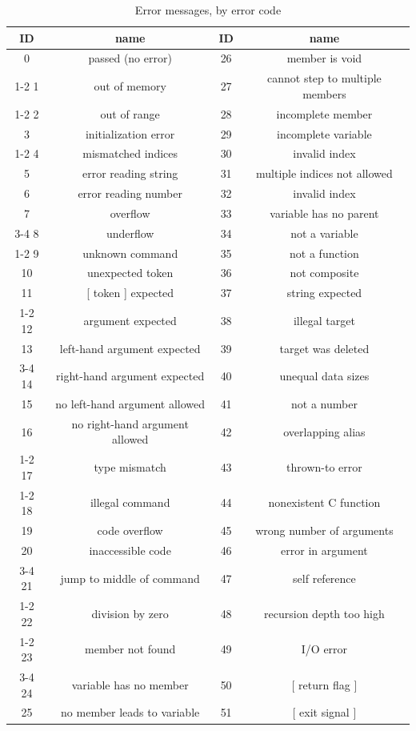 \documentclass{article}
\begin{document}
\begin{table}
\begin{center}
\begin{tabular}{|c|c||c|c|}
\hline
{\bf ID} & {\bf name} & {\bf ID} & {\bf name}\\
\hline \hline
0 & passed (no error) & 26 & member is void\\
\cline{1-2}
1 & out of memory & 27 & cannot step to multiple members\\
\cline{1-2}
2 & out of range & 28 & incomplete member\\
3 & initialization error & 29 & incomplete variable\\
\cline{1-2}
4 & mismatched indices & 30 & invalid index\\
5 & error reading string & 31 & multiple indices not allowed\\
6 & error reading number & 32 & invalid index\\
7 & overflow & 33 & variable has no parent\\
 \cline{3-4}
 8 & underflow & 34 & not a variable\\
\cline{1-2}
9 & unknown command & 35 & not a function\\
10 & unexpected token & 36 & not composite\\
11 & [ token ] expected & 37 & string expected\\
\cline{1-2} \cline{3-4}
12 & argument expected & 38 & illegal target\\
13 & left-hand argument expected & 39 & target was deleted\\
\cline{3-4}
14 & right-hand argument expected & 40 & unequal data sizes\\
15 & no left-hand argument allowed & 41 & not a number\\
16 & no right-hand argument allowed & 42 & overlapping alias\\
\cline{1-2} \cline{3-4}
17 & type mismatch & 43 & thrown-to error\\
\cline{1-2}
18 & illegal command & 44 & nonexistent C function\\
19 & code overflow & 45 & wrong number of arguments\\
20 & inaccessible code & 46 & error in argument\\
\cline{3-4}
21 & jump to middle of command & 47 & self reference\\
\cline{1-2}
22 & division by zero & 48 & recursion depth too high\\
\cline{1-2}
23 & member not found & 49 & I/O error\\
\cline{3-4}
24 & variable has no member & 50 & [ return flag ]\\
25 & no member leads to variable & 51 & [ exit signal ]\\
\hline
\end{tabular}\\
\caption{Error messages, by error code}
\label{errCodeTable}
\end{center}
\end{table}
\end{document}

